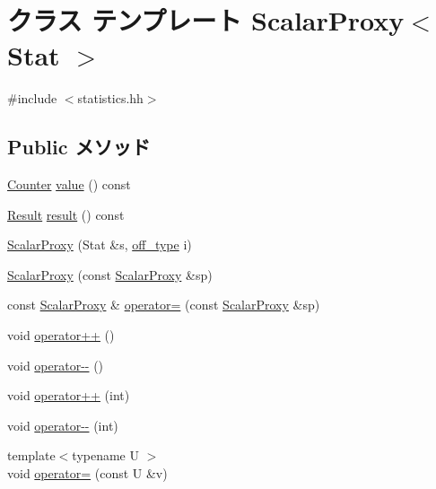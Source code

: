 \hypertarget{classStats_1_1ScalarProxy}{
\section{クラス テンプレート ScalarProxy$<$ Stat $>$}
\label{classStats_1_1ScalarProxy}
}


{\ttfamily \#include $<$statistics.hh$>$}\subsection*{Public メソッド}
\begin{DoxyCompactItemize}
\item 
\hyperlink{namespaceStats_ac35128c026c72bb36af9cea00774e8a6}{Counter} \hyperlink{classStats_1_1ScalarProxy_aa9e486cb7eb0ad44f5f89923594b68a4}{value} () const 
\item 
\hyperlink{namespaceStats_ad874d2cfd4b4a29ebd480bb2e67f20ae}{Result} \hyperlink{classStats_1_1ScalarProxy_ae050da86c3d8e8a677a0bdeb7971e1e3}{result} () const 
\item 
\hyperlink{classStats_1_1ScalarProxy_a2b211b34e1e3c1883bd14ca11e72f217}{ScalarProxy} (Stat \&s, \hyperlink{namespaceStats_a2773c9fa9e4b0b04a46b37494b44842a}{off\_\-type} i)
\item 
\hyperlink{classStats_1_1ScalarProxy_ad62084154498044522282f977bcfa1c8}{ScalarProxy} (const \hyperlink{classStats_1_1ScalarProxy}{ScalarProxy} \&sp)
\item 
const \hyperlink{classStats_1_1ScalarProxy}{ScalarProxy} \& \hyperlink{classStats_1_1ScalarProxy_a413a4ac6f4c69aa51df50a0c29a6184c}{operator=} (const \hyperlink{classStats_1_1ScalarProxy}{ScalarProxy} \&sp)
\item 
void \hyperlink{classStats_1_1ScalarProxy_a00f008b80917746917b874d00abd02a9}{operator++} ()
\item 
void \hyperlink{classStats_1_1ScalarProxy_a59f5b5b0d341cf7bd8d23f8f9f96edce}{operator-\/-\/} ()
\item 
void \hyperlink{classStats_1_1ScalarProxy_a2aefc5a84a51687145f8514f4029c26c}{operator++} (int)
\item 
void \hyperlink{classStats_1_1ScalarProxy_a132d549c024fd011da9b2f96319c5395}{operator-\/-\/} (int)
\item 
{\footnotesize template$<$typename U $>$ }\\void \hyperlink{classStats_1_1ScalarProxy_a0f6b0032b20a50bedaf20aab2f87f09d}{operator=} (const U \&v)
\item 

\end{DoxyCompactItemize}
